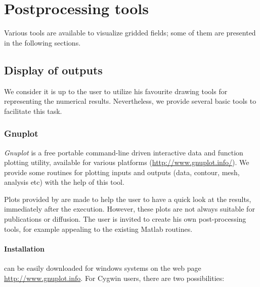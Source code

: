 \chapter{Postprocessing tools\label{chap:postprocessing}}

Various tools are available to visualize gridded fields; some of them are presented in the following sections.

\minitoc


\section{Display of outputs\label{visutools}}

We consider it is up to the user to utilize his favourite drawing tools for representing the numerical results. Nevertheless, we provide several basic tools to facilitate this task.

\subsection{Gnuplot\label{sec:visugnuplot}}

\textsl{Gnuplot} is a free portable command-line driven interactive data and function plotting utility, available for various platforms (\url{http://www.gnuplot.info/}). We provide some routines for plotting \diva inputs and outputs (data, contour, mesh, analysis etc) with the help of this tool.

\begin{tips}
Plots provided by \gnuplot are made to help the user to have a quick look at the results, immediately after the execution. However, these plots are not always suitable for publications or diffusion. The user is invited to create his own post-processing tools, for example appealing to the existing Matlab routines.
\end{tips}


\subsubsection{Installation}

\gnuplot can be easily downloaded for windows systems on the web page \url{http://www.gnuplot.info}. For Cygwin users, there are two possibilities:

